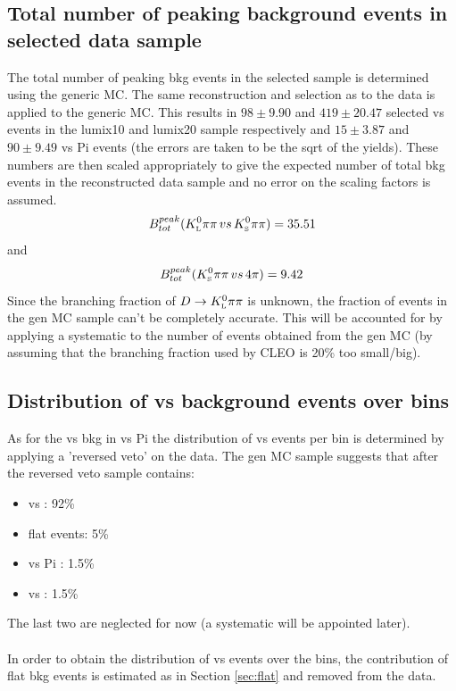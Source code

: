 \subsection{Total number of peaking background events in selected data sample}
The total number of peaking bkg events in the selected sample is determined using the generic MC. The same reconstruction and selection as to the data is applied to the generic MC. This results in $98 \pm 9.90$ and $419 \pm 20.47$ selected \KlPiPi vs \KsPiPi events in the lumix10 and lumix20 sample respectively and $15 \pm 3.87$ and $90 \pm 9.49$ \KsPiPi vs \4Pi events (the errors are taken to be the sqrt of the yields).
These numbers are then scaled appropriately to give the expected number of total bkg events in the reconstructed data sample and no error on the scaling factors is assumed.
\begin{equation}
B_{tot}^{peak}({K^0_{\rm\scriptscriptstyle L}}{\pi}\pi\, vs\, {K^0_{\rm\scriptscriptstyle S}}{\pi}\pi) = 35.51 
\end{equation}
and 
\begin{equation}
B_{tot}^{peak}({K^0_{\rm\scriptscriptstyle S}}{\pi}\pi\, vs\, 4\pi) = 9.42
\end{equation}
Since the branching fraction of $D \rightarrow {\ensuremath{K^0_{\rm\scriptscriptstyle L}}}{\ensuremath{\pi}}\pi$ is unknown, the fraction of \KlPiPi events in the gen MC sample can't be completely accurate. This will be accounted for by applying a systematic to the number of events obtained from the gen MC (by assuming that the branching fraction used by CLEO is 20\% too small/big).\\

\subsection{Distribution of \KlPiPi vs \KsPiPi background events over bins}
\label{sec:klclean}
As for the \KsPiPi vs \KsPiPi bkg in \KsPiPi vs \4Pi the distribution of \KlPiPi vs \KsPiPi events per bin is determined by applying a 'reversed \KS veto' on the data. The gen MC sample suggests that after the reversed \KS veto sample contains:
\begin{itemize}
\item \KlPiPi vs \KsPiPi : 92\%
\item flat events: 5\% 
\item \KlPiPi vs \4Pi : 1.5\%
\item \KsPiPi vs \KsPiPi : 1.5\%
\end{itemize} 
The last two are neglected for now (a systematic will be appointed later).\\
\\
In order to obtain the distribution of \KlPiPi vs \KsPiPi events over the bins, the contribution of flat bkg events is estimated as in Section \ref{sec:flat} and removed from the data.\\ 

